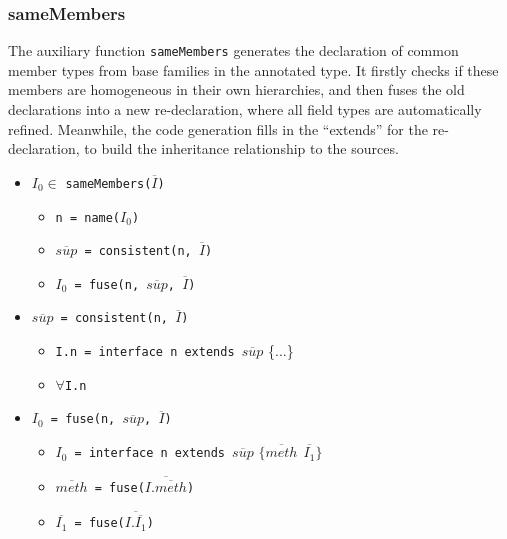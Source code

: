\subsubsection{sameMembers}
The auxiliary function \lstinline{sameMembers} generates the declaration of common member types from base families in the annotated type. It
firstly checks if these members are homogeneous in their own hierarchies, and then fuses the old declarations into a new re-declaration, where
all field types are automatically refined. Meanwhile, the code generation fills in the ``extends'' for the re-declaration, to build the inheritance
relationship to the sources.
\begin{itemize}
\item $I_0\in$ \lstinline{sameMembers(}$\overline{I}$\lstinline{)}
    \begin{itemize}
    \item \lstinline{n = name(}$I_0$\lstinline{)}
    \item $\overline{sup}$\lstinline{ = consistent(n, }$\overline{I}$\lstinline{)}
    \item $I_0$\lstinline{ = fuse(n, }$\overline{sup}$\lstinline{, }$\overline{I}$\lstinline{)}
    \end{itemize}
\item $\overline{sup}$\lstinline{ = consistent(n, }$\overline{I}$\lstinline{)}
    \begin{itemize}
    \item \lstinline{I.n = interface n extends }$\overline{sup}$ \{...\} %
    \item $\forall$\lstinline{I.n}
    \end{itemize}
\item $I_0$\lstinline{ = fuse(n, }$\overline{sup}$\lstinline{, }$\overline{I}$\lstinline{)}
    \begin{itemize}
    \item $I_0$\lstinline{ = interface n extends }$\overline{sup}$ $\{\overline{meth}\ \ \overline{I_1}\}$ %
    \item $\overline{meth}$\lstinline{ = fuse(}$\overline{I.\overline{meth}}$\lstinline{)}
    \item $\overline{I_1}$\lstinline{ = fuse(}$\overline{I.\overline{I_1}}$\lstinline{)}
    \end{itemize}
\end{itemize}

